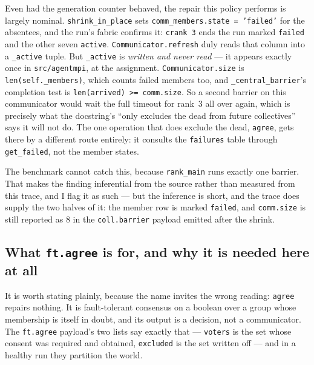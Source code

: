 \documentclass[11pt]{article}
\begin{document}
Even had the generation counter behaved, the repair this policy performs is largely
nominal. \texttt{shrink\_in\_place} sets \texttt{comm\_members.state = 'failed'} for the
absentees, and the run's fabric confirms it: \texttt{crank 3} ends the run marked
\texttt{failed} and the other seven \texttt{active}. \texttt{Communicator.refresh}
duly reads that column into a \texttt{\_active} tuple. But \texttt{\_active} is
\emph{written and never read} --- it appears exactly once in \texttt{src/agentmpi},
at the assignment. \texttt{Communicator.size} is \texttt{len(self.\_members)}, which
counts failed members too, and \texttt{\_central\_barrier}'s completion test is
\texttt{len(arrived) >= comm.size}. So a second barrier on this communicator would wait
the full timeout for rank~3 all over again, which is precisely what the docstring's
``only excludes the dead from future collectives'' says it will not do. The one operation
that does exclude the dead, \texttt{agree}, gets there by a different route entirely: it
consults the \texttt{failures} table through \texttt{get\_failed}, not the member states.

The benchmark cannot catch this, because \texttt{rank\_main} runs exactly one barrier.
That makes the finding inferential from the source rather than measured from this trace,
and I flag it as such --- but the inference is short, and the trace does supply the two
halves of it: the member row is marked \texttt{failed}, and \texttt{comm.size} is still
reported as 8 in the \texttt{coll.barrier} payload emitted after the shrink.

\subsection{What \texttt{ft.agree} is for, and why it is needed here at all}

It is worth stating plainly, because the name invites the wrong reading:
\texttt{agree} repairs nothing. It is fault-tolerant consensus on a boolean over a group
whose membership is itself in doubt, and its output is a decision, not a communicator.
The \texttt{ft.agree} payload's two lists say exactly that --- \texttt{voters} is the set
whose consent was required and obtained, \texttt{excluded} is the set written off --- and
in a healthy run they partition the world.
\end{document}
